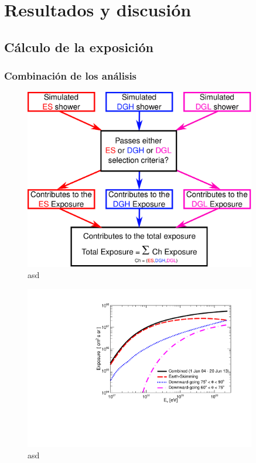 \chapter{Resultados y discusi\'on}
\label{ch:resAuger}

\section{C\'alculo de la exposici\'on}
\label{sc:expoNu}	
	
	
	
	\subsection{Combinaci\'on de los an\'alisis}
	
	\begin{figure}[h!]
		\begin{center}
			\includegraphics[width=0.9\textwidth]{fig/resultadosAuger/sketch_combined_4}
			\caption{asd}
			\label{fig:}
		\end{center}
	\end{figure}
	
	\begin{figure}[h!]
		\begin{center}
			\includegraphics[width=0.9\textwidth]{fig/resultadosAuger/exposure_combined_ageing}
			\caption{asd}
			\label{fig:}
		\end{center}
	\end{figure}

